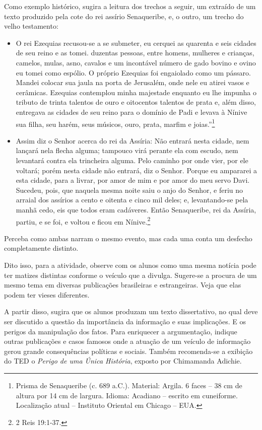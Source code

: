 \documentclass{extarticle}
\begin{document}
Como exemplo histórico, sugira a leitura dos trechos a seguir, um
extraído de um texto produzido pela cote do rei assírio Senaqueribe, e,
o outro, um trecho do velho testamento:

\begin{itemize}
\item
O rei Ezequias recusou-se a se submeter, eu cerquei as quarenta e seis
cidades de seu reino e as tomei. duzentas pessoas, entre homens,
mulheres e crianças, camelos, mulas, asno, cavalos e um incontável
número de gado bovino e ovino eu tomei como espólio. O próprio
Ezequias foi engaiolado como um pássaro. Mandei colocar sua jaula na
porta de Jerusalém, onde nele eu atirei vasos e cerâmicas. Ezequias
contemplou minha majestade enquanto eu lhe impunha o tributo de trinta
talentos de ouro e oitocentos talentos de prata e, além disso,
entregava as cidades de seu reino para o domínio de Padi e levava à
Nínive sua filha, seu harém, seus músicos, ouro, prata, marfim e
joias.''\footnote{Prisma de Senaqueribe (c. 689 a.C.). Material: Argila. 6 faces -- 38 cm de altura por 14 cm de largura. Idioma: Acadiano -- escrito em
cuneiforme. Localização atual -- Instituto Oriental em Chicago --
EUA.}

\item
  Assim diz o Senhor acerca do rei da Assíria: Não entrará nesta cidade,
  nem lançará nela flecha alguma; tampouco virá perante ela com escudo,
  nem levantará contra ela trincheira alguma. Pelo caminho por onde
  vier, por ele voltará; porém nesta cidade não entrará, diz o Senhor.
  Porque eu ampararei a esta cidade, para a livrar, por amor de mim e
  por amor do meu servo Davi. Sucedeu, pois, que naquela mesma noite
  saiu o anjo do Senhor, e feriu no arraial dos assírios a cento e
  oitenta e cinco mil deles; e, levantando-se pela manhã cedo, eis que
  todos eram cadáveres. Então Senaqueribe, rei da Assíria, partiu, e se
  foi, e voltou e ficou em Nínive.\footnote{2 Reis 19:1-37.}
\end{itemize}

Perceba como ambas narram o mesmo evento, mas cada uma conta um desfecho
completamente distinto.

Dito isso, para a atividade, observe com os alunos como uma mesma
notícia pode ter matizes distintas conforme o veículo que a divulga.
Sugere-se a procura de um mesmo tema em diversas publicações brasileiras
e estrangeiras. Veja que elas podem ter vieses diferentes.

A partir disso, sugira que os alunos produzam um texto dissertativo, no
qual deve ser discutido a questão da importância da informação e suas
implicações. E os perigos da manipulação dos fatos. Para enriquecer a
argumentação, indique outras publicações e casos famosos onde a atuação
de um veículo de informação gerou grande consequências políticas e
sociais. Também recomenda-se a exibição do TED o \emph{Perigo de uma
Única História}, exposto por Chimamanda Adichie.
\end{document}

